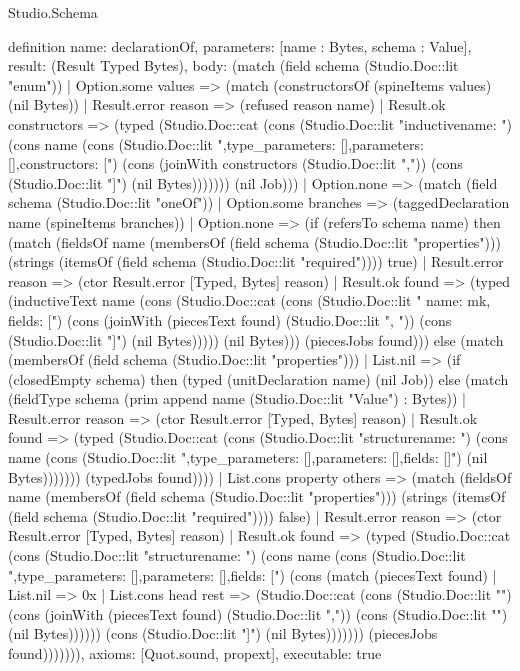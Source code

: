 \begin{lexlean}{Studio.Schema}
\begin{semanticmodule}
definition{
  name: declarationOf,
  parameters: [name : Bytes, schema : Value],
  result: (Result Typed Bytes),
  body: (match (field schema (Studio.Doc::lit "enum"))
    | Option.some values => (match (constructorsOf (spineItems values) (nil Bytes))
      | Result.error reason => (refused reason name)
      | Result.ok constructors => (typed (Studio.Doc::cat (cons (Studio.Doc::lit "inductive{\n  name: ") (cons name (cons (Studio.Doc::lit ",\n  type_parameters: [],\n  parameters: [],\n  constructors: [\n") (cons (joinWith constructors (Studio.Doc::lit ",\n")) (cons (Studio.Doc::lit "\n  ]\n}\n") (nil Bytes))))))) (nil Job)))
    | Option.none => (match (field schema (Studio.Doc::lit "oneOf"))
    | Option.some branches => (taggedDeclaration name (spineItems branches))
    | Option.none => (if (refersTo schema name) then (match (fieldsOf name (membersOf (field schema (Studio.Doc::lit "properties"))) (strings (itemsOf (field schema (Studio.Doc::lit "required")))) true)
      | Result.error reason => (ctor Result.error [Typed, Bytes] reason)
      | Result.ok found => (typed (inductiveText name (cons (Studio.Doc::cat (cons (Studio.Doc::lit "    {name: mk, fields: [") (cons (joinWith (piecesText found) (Studio.Doc::lit ", ")) (cons (Studio.Doc::lit "]}") (nil Bytes))))) (nil Bytes))) (piecesJobs found))) else (match (membersOf (field schema (Studio.Doc::lit "properties")))
    | List.nil => (if (closedEmpty schema) then (typed (unitDeclaration name) (nil Job)) else (match (fieldType schema (prim append name (Studio.Doc::lit "Value") : Bytes))
      | Result.error reason => (ctor Result.error [Typed, Bytes] reason)
      | Result.ok found => (typed (Studio.Doc::cat (cons (Studio.Doc::lit "structure{\n  name: ") (cons name (cons (Studio.Doc::lit ",\n  type_parameters: [],\n  parameters: [],\n  fields: [\n  ]\n}\n") (nil Bytes))))))) (typedJobs found))))
    | List.cons property others => (match (fieldsOf name (membersOf (field schema (Studio.Doc::lit "properties"))) (strings (itemsOf (field schema (Studio.Doc::lit "required")))) false)
      | Result.error reason => (ctor Result.error [Typed, Bytes] reason)
      | Result.ok found => (typed (Studio.Doc::cat (cons (Studio.Doc::lit "structure{\n  name: ") (cons name (cons (Studio.Doc::lit ",\n  type_parameters: [],\n  parameters: [],\n  fields: [") (cons (match (piecesText found)
        | List.nil => 0x
        | List.cons head rest => (Studio.Doc::cat (cons (Studio.Doc::lit "\n") (cons (joinWith (piecesText found) (Studio.Doc::lit ",\n")) (cons (Studio.Doc::lit "\n  ") (nil Bytes)))))) (cons (Studio.Doc::lit "]\n}\n") (nil Bytes))))))) (piecesJobs found))))))),
  axioms: [Quot.sound, propext],
  executable: true
}


\end{semanticmodule}
\end{lexlean}
